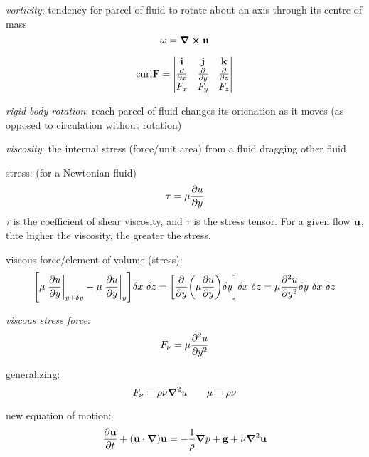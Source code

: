 \documentclass[10pt, a4paper, twocolumn]{article}
\newcommand{\deff}[1]{\par \noindent \textit{#1}: }
\begin{document}
\deff{vorticity}
tendency for parcel of fluid to rotate about an axis through its centre of mass
\[\vb \omega =\curl \vb u\]

\[\mathrm{curl} \vb F =
\begin{vmatrix}
\vb i&\vb j&\vb k
\\ \pdv{x}&\pdv{y}&\pdv{z}
\\ F_x&F_y&F_z
\end{vmatrix} \]

\deff{rigid body rotation}
reach parcel of fluid changes its orienation as it moves (as opposed to circulation without rotation)

\deff{viscosity}
the internal stress (force/unit area) from a fluid dragging other fluid

stress: (for a Newtonian fluid)
\[\tau = \mu \pdv{u}{y}\]
$\tau$ is the coefficient of shear viscosity, and $\tau$ is the stress tensor. For a given flow $\vb u$, thte higher the viscosity, the greater the stress.

viscous force/element of volume (stress):
\[
\bqty{
  \mu \eval{\pdv{u}{y}}_{y+\delta y}
  -\mu \eval{\pdv{u}{y}}_{y}
}
\delta x\ \delta z
=\bqty{
  \pdv{y}\pqty{\mu\pdv{u}{y}}
  \delta y
}
\delta x\ \delta z
=\mu\pdv[2]{u}{y}\delta y\ \delta x\ \delta z
\]

\deff{viscous stress force}
\[ F_\nu=\mu\pdv[2]{u}{y}\]

generalizing:
\[F_\nu = \rho\nu \grad^2{u}
\qquad \mu = \rho\nu \]

new equation of motion:
\[\pdv{\vb u}{t}
+(\vb u\cdot \grad{})\vb u
=-\frac{1}{\rho}
\grad p
+\vb g + \nu\grad ^2\vb u
\]
\end{document}
